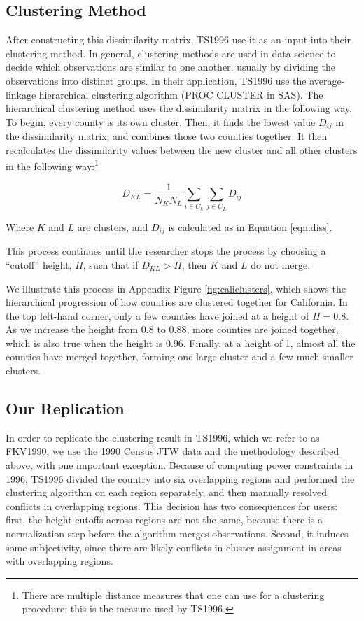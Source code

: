 \subsection{Clustering Method}

After constructing this dissimilarity matrix, TS1996 use it as an input into their clustering method. In general, clustering methods are used in data science to decide which observations are similar to one another, usually by dividing the observations into distinct groups. In their application, TS1996 use the average-linkage hierarchical clustering algorithm (PROC CLUSTER in SAS). The hierarchical clustering method uses the dissimilarity matrix in the following way. To begin, every county is its own cluster. Then, it finds the lowest value $D_{ij}$ in the dissimilarity matrix, and combines those two counties together. It then recalculates the dissimilarity values between the new cluster and all other clusters in the following way:\footnote{There are multiple distance measures that one can use for a clustering procedure; this is the measure used by TS1996.}

\begin{equation}
D_{KL} = \frac{1}{N_K N_L} \sum_{i \in C_k} \sum_{j \in C_L} D_{ij}
\end{equation}

Where $K$ and $L$ are clusters, and $D_{ij}$ is calculated as in Equation \ref{eqn:diss}.

This process continues until the researcher stops the process by choosing a ``cutoff'' height, $H$, such that if $D_{KL}>H$, then $K$ and $L$ do not merge.

We illustrate this process in Appendix Figure \ref{fig:caliclusters}, which shows the hierarchical progression of how counties are clustered together for California. In the top left-hand corner, only a few counties have joined at a height of $H=0.8$. As we increase the height from 0.8 to 0.88, more counties are joined together, which is also true when the height is 0.96. Finally, at a height of 1, almost all the counties have merged together, forming one large cluster and a few much smaller clusters.

\subsection{Our Replication}
\FloatBarrier

In order to replicate the clustering result in TS1996, which we  refer to as FKV1990, we use the 1990 Census JTW data and the methodology described above, with one important exception. Because of computing power constraints in 1996, TS1996 divided the country into six overlapping regions and performed the clustering algorithm on each region separately, and then manually resolved conflicts in overlapping regions. This decision has two consequences for users: first, the height cutoffs across regions are not the same, because there is a normalization step before the algorithm merges observations. Second, it induces some subjectivity, since there are likely conflicts in cluster assignment in areas with overlapping regions.

